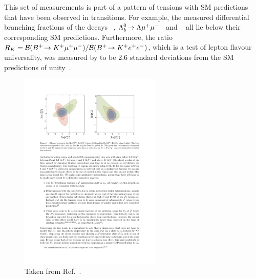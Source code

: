 This set of measurements is part of a pattern of tensions with SM predictions that have been observed in \btosmm transitions. For example, the measured differential branching fractions of the decays \BsTophimm~\cite{bsphimm-lhcb}, ${{\Lambda}^0_{b}}\!\rightarrow \Lambda{\ensuremath{\mu^+\mu^-}}$~\cite{lblmm-lhcb} and \BuToKmm~\cite{kmm-lhcb} all lie below their corresponding SM predictions. Furthermore, the ratio $R_{K} = {\mathcal{B}}({{{B}^+}}\!\rightarrow {\ensuremath{{K}^+}}{\ensuremath{\mu^+}}{\ensuremath{\mu^-}})/{\mathcal{B}}({{{B}^+}}\!\rightarrow {\ensuremath{{K}^+}}{\ensuremath{e^+}}{\ensuremath{e^-}})$, which is a test of lepton flavour universality, was measured by \lhcb to be 2.6 standard deviations from the SM predictions of unity~\cite{rk-lhcb}.

\begin{figure}[!tb]
\centering
\includegraphics[trim={2.5cm 20cm 10.7cm 2.4cm},clip,width=0.6\textwidth]{figs/kpimm/introduction/c9c10.pdf}
\caption{Taken from Ref.~\cite{straub}.}
\label{fig:kpimm:c9c10}
\end{figure}



